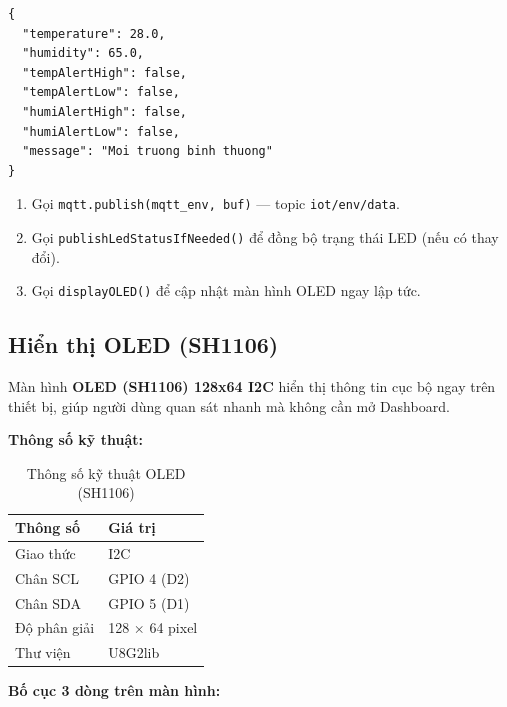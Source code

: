 \documentclass[13pt,a4paper]{article}
\newcommand{\code}[1]{\texttt{#1}}
\begin{document}
\begin{lstlisting}[style=jsoncode, caption={JSON payload gửi lên topic iot/env/data}, label={lst:dhtjson}]
{
  "temperature": 28.0,
  "humidity": 65.0,
  "tempAlertHigh": false,
  "tempAlertLow": false,
  "humiAlertHigh": false,
  "humiAlertLow": false,
  "message": "Moi truong binh thuong"
}
\end{lstlisting}

\begin{enumerate}[label=\arabic*., leftmargin=1.5cm, resume]
    \item Gọi \code{mqtt.publish(mqtt\_env, buf)} --- topic \code{iot/env/data}.
    \item Gọi \code{publishLedStatusIfNeeded()} để đồng bộ trạng thái LED (nếu có thay đổi).
    \item Gọi \code{displayOLED()} để cập nhật màn hình OLED ngay lập tức.
\end{enumerate}

\subsection{Hiển thị OLED (SH1106)}
\label{sec:oled}

Màn hình \textbf{OLED (SH1106) 128x64 I2C} hiển thị thông tin cục bộ ngay trên thiết bị, giúp người dùng quan sát nhanh mà không cần mở Dashboard.

\textbf{Thông số kỹ thuật:}

\begin{table}[htbp]
    \centering
    \caption{Thông số kỹ thuật OLED (SH1106)}
    \label{tbl:oled}
    \begin{tabular}{|L{4cm}|C{5cm}|}
        \hline
        \textbf{Thông số} & \textbf{Giá trị} \\
        \hline
        Giao thức & I2C \\
        \hline
        Chân SCL & GPIO 4 (D2) \\
        \hline
        Chân SDA & GPIO 5 (D1) \\
        \hline
        Độ phân giải & 128 $\times$ 64 pixel \\
        \hline
        Thư viện & U8G2lib \\
        \hline
    \end{tabular}
\end{table}

\textbf{Bố cục 3 dòng trên màn hình:}
\end{document}
